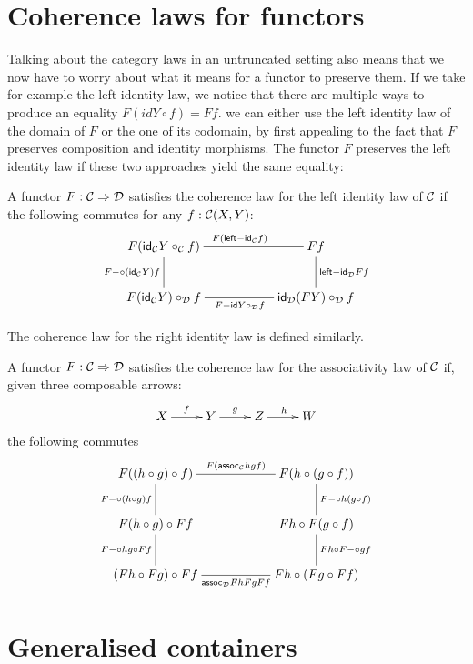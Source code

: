 \section{Coherence laws for functors}

Talking about the category laws in an untruncated setting also means
that we now have to worry about what it means for a functor to
preserve them. If we take for example the left identity law, we notice
that there are multiple ways to produce an equality
$F (id Y \circ f) = F f$. we can either use the left identity law of
the domain of $F$ or the one of its codomain, by first appealing to
the fact that $F$ preserves composition and identity morphisms. The
functor $F$ preserves the left identity law if these two approaches
yield the same equality:

\begin{definition}
  A functor $F : \mathcal{C} \Rightarrow \mathcal{D}$ satisfies the coherence law for the
  left identity law of $\mathcal{C}$ if the following commutes for any $f : \mathcal{C}(X,Y)$:
  $$
  \xymatrix{
    F (\id_{\Cc} Y \circ_{\Cc} f) \ar@{-}[rr]^{F (\leftid_{\Cc} f)} \ar@{-}[d]_{\Fcomp (\id_{\Cc} Y) f} &&F f \ar@{-}[d]^{\leftid_{\Dd} F f} \\
    F (\id_{\Cc} Y) \circ_{\Dd} f \ar@{-}[rr]_{\Fid Y \circ_{\Dd} f} &&\id_{\Dd} (F Y) \circ_{\Dd} f
  }
  $$  
\end{definition}

The coherence law for the right identity law is defined similarly.

\begin{definition}
  A functor $F : \mathcal{C} \Rightarrow \mathcal{D}$ satisfies the coherence law for the
  associativity law of $\mathcal{C}$ if, given three composable arrows:
  $$
  \xymatrix{
    X \ar[r]^{f} &Y \ar[r]^{g} &Z \ar[r]^{h} &W
  }
  $$
  the following commutes
  $$
  \xymatrix{
    F ((h \circ g) \circ f) \ar@{-}[rr]^{F (\assoc_{\Cc} h g f)} \ar@{-}[d]_{\Fcomp (h \circ g) f} &&F (h \circ (g \circ f)) \ar@{-}[d]^{\Fcomp h (g \circ f)} \\
    F (h \circ g) \circ F f \ar@{-}[d]_{\Fcomp h g \circ F f} &&F h \circ F (g \circ f) \ar@{-}[d]^{F h \circ \Fcomp g f} \\
    (F h \circ F g) \circ F f  \ar@{-}[rr]_{\assoc_{\Dd} Fh Fg Ff} && F h \circ (F g \circ F f)
  }
  $$
\end{definition}

\section{Generalised containers}

